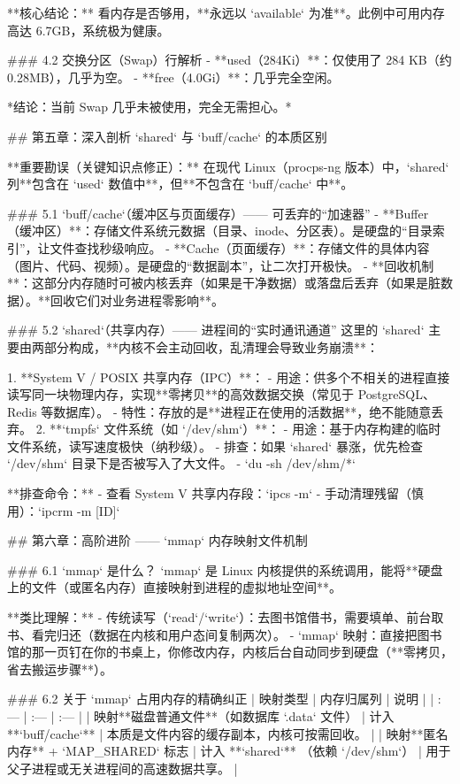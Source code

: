 **核心结论：** 看内存是否够用，**永远以 `available` 为准**。此例中可用内存高达 6.7GB，系统极为健康。

### 4.2 交换分区（Swap）行解析
-   **used（284Ki）**：仅使用了 284 KB（约 0.28MB），几乎为空。
-   **free（4.0Gi）**：几乎完全空闲。

*结论：当前 Swap 几乎未被使用，完全无需担心。*


## 第五章：深入剖析 `shared` 与 `buff/cache` 的本质区别

**重要勘误（关键知识点修正）：**
在现代 Linux（procps-ng 版本）中，`shared` 列**包含在 `used` 数值中**，但**不包含在 `buff/cache` 中**。

### 5.1 `buff/cache`（缓冲区与页面缓存）—— 可丢弃的“加速器”
-   **Buffer（缓冲区）**：存储文件系统元数据（目录、inode、分区表）。是硬盘的“目录索引”，让文件查找秒级响应。
-   **Cache（页面缓存）**：存储文件的具体内容（图片、代码、视频）。是硬盘的“数据副本”，让二次打开极快。
-   **回收机制**：这部分内存随时可被内核丢弃（如果是干净数据）或落盘后丢弃（如果是脏数据）。**回收它们对业务进程零影响**。

### 5.2 `shared`（共享内存）—— 进程间的“实时通讯通道”
这里的 `shared` 主要由两部分构成，**内核不会主动回收，乱清理会导致业务崩溃**：

1.  **System V / POSIX 共享内存（IPC）**：
    -   用途：供多个不相关的进程直接读写同一块物理内存，实现**零拷贝**的高效数据交换（常见于 PostgreSQL、Redis 等数据库）。
    -   特性：存放的是**进程正在使用的活数据**，绝不能随意丢弃。
2.  **`tmpfs` 文件系统（如 `/dev/shm`）**：
    -   用途：基于内存构建的临时文件系统，读写速度极快（纳秒级）。
    -   排查：如果 `shared` 暴涨，优先检查 `/dev/shm` 目录下是否被写入了大文件。
    -   `du -sh /dev/shm/*`

**排查命令：**
-   查看 System V 共享内存段：`ipcs -m`
-   手动清理残留（慎用）：`ipcrm -m [ID]`


## 第六章：高阶进阶 —— `mmap` 内存映射文件机制

### 6.1 `mmap` 是什么？
`mmap` 是 Linux 内核提供的系统调用，能将**硬盘上的文件（或匿名内存）直接映射到进程的虚拟地址空间**。

**类比理解：**
-   传统读写（`read`/`write`）：去图书馆借书，需要填单、前台取书、看完归还（数据在内核和用户态间复制两次）。
-   `mmap` 映射：直接把图书馆的那一页钉在你的书桌上，你修改内存，内核后台自动同步到硬盘（**零拷贝，省去搬运步骤**）。

### 6.2 关于 `mmap` 占用内存的精确纠正
| 映射类型 | 内存归属列 | 说明 |
| :--- | :--- | :--- |
| 映射**磁盘普通文件**（如数据库 `.data` 文件） | 计入 **`buff/cache`** | 本质是文件内容的缓存副本，内核可按需回收。 |
| 映射**匿名内存** + `MAP_SHARED` 标志 | 计入 **`shared`** （依赖 `/dev/shm`） | 用于父子进程或无关进程间的高速数据共享。 |

